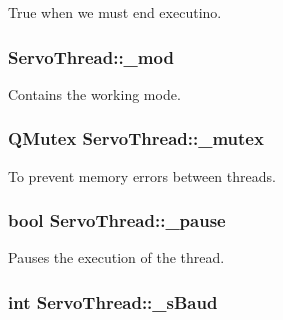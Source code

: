 True when we must end executino. 

\hypertarget{a00008_acdecea1688594d3ab7386a6db97dd90d}{}
\subsubsection[{\+\_\+mod}]{ Servo\+Thread\+::\+\_\+mod\hspace{0.3cm}{\ttfamily [private]}}\label{a00008_acdecea1688594d3ab7386a6db97dd90d}


Contains the working mode. 

\hypertarget{a00008_a6327eafc0dac189ec1b202d63ef32457}{}
\subsubsection[{\+\_\+mutex}]{\setlength{\rightskip}{0pt plus 5cm}Q\+Mutex Servo\+Thread\+::\+\_\+mutex\hspace{0.3cm}{\ttfamily [private]}}\label{a00008_a6327eafc0dac189ec1b202d63ef32457}


To prevent memory errors between threads. 

\hypertarget{a00008_aaf2ef80e8e43518b75d20a5102970d2e}{}
\subsubsection[{\+\_\+pause}]{\setlength{\rightskip}{0pt plus 5cm}bool Servo\+Thread\+::\+\_\+pause\hspace{0.3cm}{\ttfamily [private]}}\label{a00008_aaf2ef80e8e43518b75d20a5102970d2e}


Pauses the execution of the thread. 

\hypertarget{a00008_a5b9a41b9e271275b914affb0a845a2ee}{}
\subsubsection[{\+\_\+s\+Baud}]{\setlength{\rightskip}{0pt plus 5cm}int Servo\+Thread\+::\+\_\+s\+Baud\hspace{0.3cm}{\ttfamily [private]}}\label{a00008_a5b9a41b9e271275b914affb0a845a2ee}


